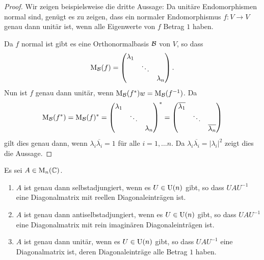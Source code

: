 \begin{proof}
  Wir zeigen beispielsweise die dritte Aussage:
  Da unitäre Endomorphismen normal sind, genügt es zu zeigen, dass ein normaler Endomorphismus $f \colon V \to V$ genau dann unitär ist, wenn alle Eigenwerte von $f$ Betrag $1$ haben.
  
  Da $f$ normal ist gibt es eine Orthonormalbasis $\mathcal{B}$ von $V$, so dass
  \[
    \mathrm{M}_{\mathcal{B}}(f)
    =
    \begin{pmatrix}
      \lambda_1 &         &           \\
                & \ddots  &           \\
                &         & \lambda_n
    \end{pmatrix}.
  \]
  Nun ist $f$ genau dann unitär, wenn $\mathrm{M}_{\mathcal{B}}(f^*)w = \mathrm{M}_{\mathcal{B}}(f^{-1})$.
  Da
  \[
    \mathrm{M}_{\mathcal{B}}(f^*)
    =
    \mathrm{M}_{\mathcal{B}}(f)^*
    =
    \begin{pmatrix}
      \lambda_1 &         &           \\
                & \ddots  &           \\
                &         & \lambda_n
    \end{pmatrix}^*
    =
    \begin{pmatrix}
      \overline{\lambda_1}  &         &                       \\
                            & \ddots  &                       \\
                            &         & \overline{\lambda_n}
    \end{pmatrix}
  \]
  gilt dies genau dann, wenn $\lambda_i \overline{\lambda_i} = 1$ für alle $i = 1, \dotsc n$.
  Da $\lambda_i \overline{\lambda_i} = |\lambda_i|^2$ zeigt dies die Aussage.
\end{proof}



\begin{corollary}
  Es sei $A \in \mathrm{M}_n(\mathbb{C})$.
  \begin{enumerate}[leftmargin=*, label=\roman*)]
    \item
      $A$ ist genau dann selbstadjungiert, wenn es $U \in \mathrm{U}(n)$ gibt, so dass $U\!A U^{-1}$ eine Diagonalmatrix mit reellen Diagonaleinträgen ist.
    \item
      $A$ ist genau dann antiselbstadjungiert, wenn es $U \in \mathrm{U}(n)$ gibt, so dass $U\!A U^{-1}$ eine Diagonalmatrix mit rein imaginären Diagonaleinträgen ist.
    \item
      $A$ ist genau dann unitär, wenn es $U \in \mathrm{U}(n)$ gibt, so dass $U\!A U^{-1}$ eine Diagonalmatrix ist, deren Diagonaleinträge alle Betrag $1$ haben.
  \end{enumerate}
\end{corollary}


